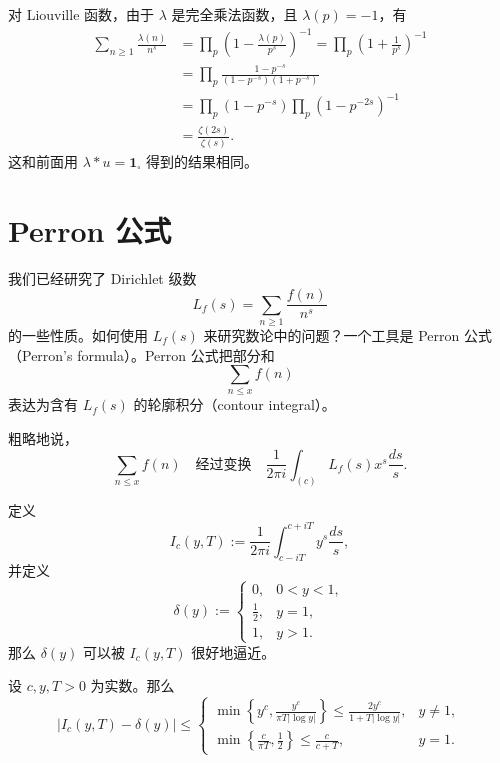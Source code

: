 \begin{example}
	对 Liouville 函数，由于 $\lambda$ 是完全乘法函数，且 $\lambda(p)=-1$，有
	\[
	\begin{aligned}
		\sum_{n\geq 1}\frac{\lambda(n)}{n^s}
		&=
		\prod_p\left(1-\frac{\lambda(p)}{p^s}\right)^{-1}
		=
		\prod_p\left(1+\frac1{p^s}\right)^{-1}\\
		&=
		\prod_p
		\frac{1-p^{-s}}{(1-p^{-s})(1+p^{-s})}\\
		&=
		\prod_p(1-p^{-s})\prod_p(1-p^{-2s})^{-1}\\
		&=
		\frac{\zeta(2s)}{\zeta(s)}.
	\end{aligned}
	\]
	这和前面用 $\lambda*u=\mathbf 1_{\square}$ 得到的结果相同。
\end{example}

\section{Perron 公式}

我们已经研究了 Dirichlet 级数
\[
	L_f(s)=\sum_{n\geq 1}\frac{f(n)}{n^s}
\]
的一些性质。如何使用 $L_f(s)$ 来研究数论中的问题？一个工具是 Perron 公式（Perron's formula）。Perron 公式把部分和
\[
	\sum_{n\leq x}f(n)
\]
表达为含有 $L_f(s)$ 的轮廓积分（contour integral）。

粗略地说，
\[
	\sum_{n\leq x}f(n)
	\quad\text{经过变换}\quad
	\frac1{2\pi i}\int_{(c)}L_f(s)x^s\frac{ds}{s}.
\]

定义
\[
	I_c(y,T):=
	\frac1{2\pi i}\int_{c-iT}^{c+iT}y^s\frac{ds}{s},
\]
并定义
\[
	\delta(y):=
	\begin{cases}
		0, & 0<y<1,\\
		\frac12, & y=1,\\
		1, & y>1.
	\end{cases}
\]
那么 $\delta(y)$ 可以被 $I_c(y,T)$ 很好地逼近。

\begin{lemma}[原文 Lemma 4.9]
	设 $c,y,T>0$ 为实数。那么
	\[
		|I_c(y,T)-\delta(y)|
		\leq
		\begin{cases}
			\displaystyle
			\min\left\{y^c,\frac{y^c}{\pi T|\log y|}\right\}
			\leq \displaystyle\frac{2y^c}{1+T|\log y|},
			& y\neq 1,\\[1.2em]
			\displaystyle
			\min\left\{\frac{c}{\pi T},\frac12\right\}
			\leq \displaystyle\frac{c}{c+T},
			& y=1.
		\end{cases}
	\]
\end{lemma}

